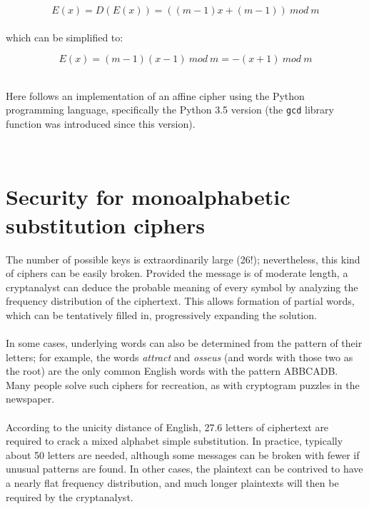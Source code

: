 \documentclass[Lau,binding=0.6cm,oneside]{sapthesis}
\begin{document}
\begin{equation}
E{(x)} = D{(E{(x)})} = ((m-1)x + (m-1)) \ mod \ m
\end{equation}
\ \\
which can be simplified to:

\begin{equation}
E{(x)} = (m-1)(x-1) \ mod \ m = -(x+1) \ mod \ m
\end{equation}

\ \\
Here follows an implementation of an affine cipher using the Python programming language, specifically the \textsf{Python 3.5} version (the \texttt{gcd} library function was introduced since this version).\\


\ \\
\section{Security for monoalphabetic substitution ciphers}
The number of possible keys is extraordinarily large (26!); nevertheless, this kind of ciphers can be easily broken. Provided the message is of moderate length, a cryptanalyst can deduce the probable meaning of every symbol by analyzing the frequency distribution of the ciphertext. This allows formation of partial words, which can be tentatively filled in, progressively expanding the solution.\\\\
In some cases, underlying words can also be determined from the pattern of their letters; for example, the words \textit{attract} and \textit{osseus} (and words with those two as the root) are the only common English words with the pattern \textsf{ABBCADB}. Many people solve such ciphers for recreation, as with cryptogram puzzles in the newspaper.\\\\
According to the unicity distance of English, 27.6 letters of ciphertext are required to crack a mixed alphabet simple substitution. In practice, typically about 50 letters are needed, although some messages can be broken with fewer if unusual patterns are found. In other cases, the plaintext can be contrived to have a nearly flat frequency distribution, and much longer plaintexts will then be required by the cryptanalyst.
\end{document}
